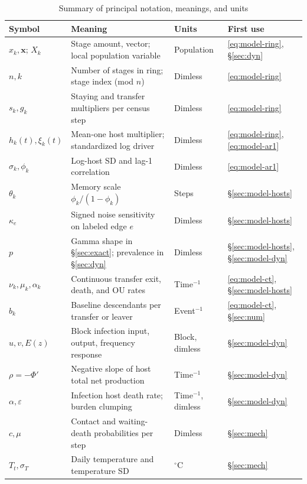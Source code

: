 \begin{table}[t]
\caption{Summary of principal notation, meanings, and units}\label{tab:model-notation}
{\scriptsize\setlength{\tabcolsep}{0.5pt}
\begin{tabular*}{\textwidth}{@{\extracolsep{\fill}}llll@{}}
\toprule
Symbol & Meaning & Units & First use \\
\midrule
$x_k, \mathbf{x};\, X_k$ & Stage amount, vector; local population variable & Population & \eqref{eq:model-ring}, \S\ref{sec:dyn} \\
$n, k$ & Number of stages in ring; stage index (mod $n$) & Dimless & \eqref{eq:model-ring} \\
$s_k, g_k$ & Staying and transfer multipliers per census step & Dimless & \eqref{eq:model-ring} \\
$h_k(t), \xi_k(t)$ & Mean-one host multiplier; standardized log driver & Dimless & \eqref{eq:model-ring}, \eqref{eq:model-ar1} \\
$\sigma_k, \phi_k$ & Log-host SD and lag-1 correlation & Dimless & \eqref{eq:model-ar1} \\
$\theta_k$ & Memory scale $\phi_k/(1-\phi_k)$ & Steps & \S\ref{sec:model-hosts} \\
$\kappa_e$ & Signed noise sensitivity on labeled edge $e$ & Dimless & \S\ref{sec:model-hosts} \\
$p$ & Gamma shape in \S\ref{sec:exact}; prevalence in \S\ref{sec:dyn} & Dimless & \S\ref{sec:model-hosts}, \S\ref{sec:model-dyn} \\
$\nu_k, \mu_k, \alpha_k$ & Continuous transfer exit, death, and OU rates & Time$^{-1}$ & \eqref{eq:model-ct}, \S\ref{sec:model-hosts} \\
$b_k$ & Baseline descendants per transfer or leaver & Event$^{-1}$ & \eqref{eq:model-ct}, \S\ref{sec:num} \\
$u, v, E(z)$ & Block infection input, output, frequency response & Block, dimless & \S\ref{sec:model-dyn} \\
$\rho = -\Phi'$ & Negative slope of host total net production & Time$^{-1}$ & \S\ref{sec:model-dyn} \\
$\alpha, \varepsilon$ & Infection host death rate; burden clumping & Time$^{-1}$, dimless & \S\ref{sec:model-dyn} \\
$c, \mu$ & Contact and waiting-death probabilities per step & Dimless & \S\ref{sec:mech} \\
$T_t, \sigma_T$ & Daily temperature and temperature SD & $^{\circ}\mathrm{C}$ & \S\ref{sec:mech} \\

\end{tabular*}}
\end{table}
